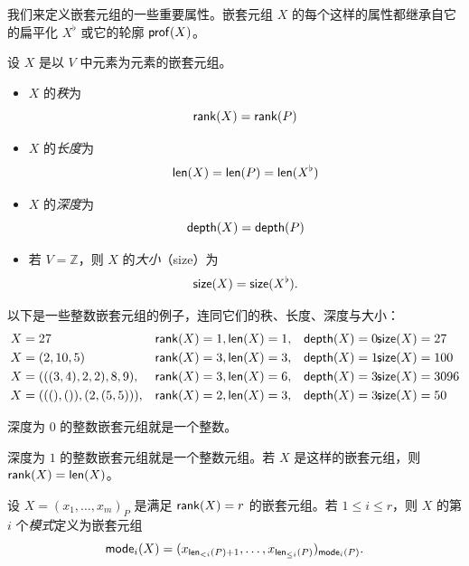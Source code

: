 我们来定义嵌套元组的一些重要属性。嵌套元组 $X$ 的每个这样的属性都继承自它的扁平化 $X^\flat$ 或它的轮廓 $\mathsf{prof}(X)$。

\begin{definition}\label{definitionofnestedtupleattributes}
    设 $X$ 是以 $V$ 中元素为元素的嵌套元组。
    \begin{itemize} 
    \item $X$ 的{\it 秩}为
    \[
    \mathsf{rank}(X) = \mathsf{rank}(P)
    \]
    \item $X$ 的{\it 长度}为
    \[
    \mathsf{len}(X) = \mathsf{len}(P) = \mathsf{len}(X^\flat)
    \]
    \item $X$ 的{\it 深度}为
    \[
    \mathsf{depth}(X) = \mathsf{depth}(P)
    \]
    \item 若 $V = \mathbb{Z}$，则 $X$ 的{\it 大小}（size）为
    \[
    \mathsf{size}(X) = \mathsf{size}(X^\flat).
    \]
    \end{itemize}
\end{definition}


\begin{example}
以下是一些整数嵌套元组的例子，连同它们的秩、长度、深度与大小：
\[
\begin{aligned}
X &= 27 & \rank(X) &= 1, \len(X)  = 1, & \depth(X) &= 0, \mspace{-9mu} \size(X) = 27 \\
X &= (2,10,5) & \rank(X) &= 3, \len(X)  = 3, &\depth(X) &= 1, \mspace{-9mu} \size(X) = 100 \\
X &= (((3,4),2,2),8,9), & \rank(X) &= 3, \len(X)  = 6, & \depth(X) &= 3, \mspace{-9mu} \size(X) = 3096 \\
X &= (((),()),(2,(5,5))), & \rank(X) &= 2, \len(X)  = 3, & \depth(X) &= 3, \mspace{-9mu} \size(X) = 50 \\
\end{aligned}
\]
\end{example}

\begin{example}
    深度为 $0$ 的整数嵌套元组就是一个整数。
\end{example}

\begin{example}
深度为 $1$ 的整数嵌套元组就是一个整数元组。若 $X$ 是这样的嵌套元组，则 $\mathsf{rank}(X) = \mathsf{len}(X)$。
\end{example}

\begin{definition}\label{definitionofmodeofnestedtuple}
设 $X = (x_1,\dots,x_m)_P$ 是满足 $\mathsf{rank}(X) = r$ 的嵌套元组。若 $1 \leq i \leq r$，则 $X$ 的第 $i$ 个{\it 模式}定义为嵌套元组
\[
\mathsf{mode}_i(X) = (x_{\mathsf{len}_{<i}(P) + 1},\dots,x_{\mathsf{len}_{\leq i}(P)})_{\mathsf{mode}_i(P)}.
\]
\end{definition}

